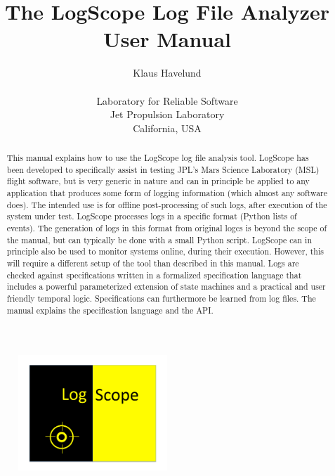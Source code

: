 \documentclass{report}
\newcommand{\python}{{\sc Python}}
\newcommand{\logscope}{{\sc LogScope}}
\begin{document}
\begin{figure}
\begin{center}
\includegraphics[width=0.5\textwidth]{graphics/logo}
\end{center}
\end{figure}


\title{The \logscope{} Log File Analyzer\\ User Manual}
\author{Klaus Havelund\\ \\
Laboratory for Reliable Software\\
Jet Propulsion Laboratory\\ 
California, USA}

\maketitle


\begin{abstract}

\noindent
This manual explains how to use the \logscope{} log file analysis tool.
\logscope{} has been developed to specifically assist in testing JPL's Mars Science Laboratory (MSL) 
flight software, but is very generic in nature and can in principle be applied to any application that produces 
some form of logging information (which almost any software does). 
The intended use is for offline post-processing of such logs, after execution of the system under test.
\logscope{} processes logs in a specific format (\python{} lists of events). 
The generation of logs in this format from original logcs is beyond the scope of the manual,
but can typically be done with a small \python{} script. 
\logscope{} can in principle also be used to monitor systems online, during their execution. 
However, this will require a different setup of the tool than described in
this manual.  Logs are checked against specifications written in a formalized 
specification language that includes a powerful parameterized extension of state 
machines and a practical and user friendly temporal logic. 
Specifications can furthermore be learned from log files.
The manual explains the specification language and the API.
\end{abstract}
\end{document}
